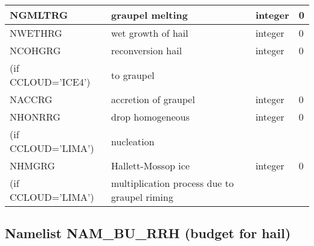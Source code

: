 \begin{center}
\begin{tabular} {|p{8cm}|p{4cm}|>{\centering}p{1.5cm}|p{1.5cm}<{\centering}|}
NGMLTRG  & graupel melting  & integer  &  0 \index{NGMLTRG!\innam{NAM\_BU\_RRG}}\\\hline
NWETHRG  & wet growth of hail & integer  &  0 \index{NWETHRG!\innam{NAM\_BU\_RRG}}\\\hline
NCOHGRG  & reconversion hail & integer  &  0 \index{NCOHGRG!\innam{NAM\_BU\_RRG}}\\
(if CCLOUD='ICE4') & to graupel  &   &  \\\hline
NACCRG  & accretion of graupel & integer  &  0 \index{NACCRG!\innam{NAM\_BU\_RRG}}\\\hline
NHONRRG  & drop homogeneous  & integer  &  0 \index{NHONRRG!\innam{NAM\_BU\_RRG}}\\
(if CCLOUD='LIMA') &nucleation  &   &  \\\hline
NHMGRG  & Hallett-Mossop ice  & integer  &  0 \index{NHMGRG!\innam{NAM\_BU\_RRG}}\\
(if CCLOUD='LIMA') & multiplication process due to graupel riming  &   &  \\\hline
\end{tabular}
\end{center}

\newpage
\subsection{Namelist NAM\_BU\_RRH (budget for hail)}

